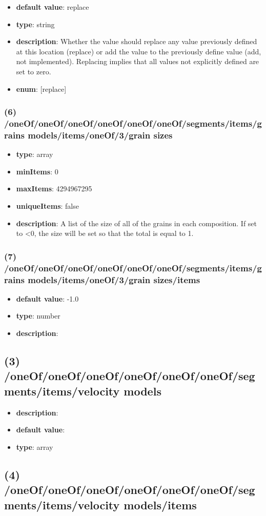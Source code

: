 \begin{itemize}[leftmargin=6em]\item {\bf default value}: replace
\item {\bf type}: string
\item {\bf description}: Whether the value should replace any value previously defined at this location (replace) or add the value to the previously define value (add, not implemented). Replacing implies that all values not explicitly defined are set to zero.
\item {\bf enum}: [replace]\end{itemize}\subsubsection{(6) /oneOf/oneOf/oneOf/oneOf/oneOf/oneOf/segments/items/grains models/items/oneOf/3/grain sizes}
\begin{itemize}[leftmargin=6em]\item {\bf type}: array
\item {\bf minItems}: 0
\item {\bf maxItems}: 4294967295
\item {\bf uniqueItems}: false
\item {\bf description}: A list of the size of all of the grains in each composition. If set to <0, the size will be set so that the total is equal to 1.
\end{itemize}\subsubsection{(7) /oneOf/oneOf/oneOf/oneOf/oneOf/oneOf/segments/items/grains models/items/oneOf/3/grain sizes/items}
\begin{itemize}[leftmargin=7em]\item {\bf default value}: -1.0
\item {\bf type}: number
\item {\bf description}: 
\end{itemize}\subsection{(3) /oneOf/oneOf/oneOf/oneOf/oneOf/oneOf/segments/items/velocity models}
\begin{itemize}[leftmargin=3em]\item {\bf description}: 
\item {\bf default value}: 
\item {\bf type}: array
\end{itemize}\subsection{(4) /oneOf/oneOf/oneOf/oneOf/oneOf/oneOf/segments/items/velocity models/items}

